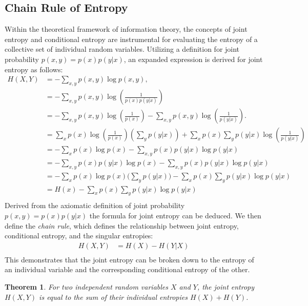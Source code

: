 \documentclass[journal,12pt,onecolumn,draftclsnofoot,]{IEEEtran}
\newtheorem{theorem}{Theorem}
\begin{document}
	
	\subsection{Chain Rule of Entropy}
	Within the theoretical framework of information theory, the concepts of joint entropy and conditional entropy are instrumental for evaluating the entropy of a collective set of individual random variables. Utilizing a  definition for joint probability \( p(x, y) = p(x) p(y | x) \), an expanded expression is derived for joint entropy as follows:
	\begin{align}
		H(X, Y) & = -\sum_{x, y} p(x, y) \log p(x, y), \\
		&= -\sum_{x, y} p(x, y) \log \left(\frac{1}{p(x)p(y|x)}\right) \\
		&= -\sum_{x, y} p(x, y) \log \left(\frac{1}{p(x)}\right) - \sum_{x, y} p(x, y) \log \left(\frac{1}{p(y|x)}\right).\\
		&= \sum_{x} p(x) \log \left(\frac{1}{p(x)}\right) \left(\sum_{y} p(y|x)\right) + \sum_{x} p(x) \sum_{y} p(y|x) \log \left(\frac{1}{p(y|x)}\right) \\
		& = -\sum_{x} p(x) \log p(x) - \sum_{x,y} p(x) p(y|x) \log p(y|x) \\
		& = -\sum_{x,y} p(x) p(y|x) \log p(x) - \sum_{x,y} p(x) p(y|x) \log p(y|x) \\
		& = -\sum_{x} p(x)  \log p(x) \Biggr( \sum_{y}  p(y|x)  \Biggr) - \sum_{x} p(x)  \sum_{y}  p(y|x)   \log p(y|x) \\
		& =H(x) - \sum_{x} p(x)  \sum_{y}  p(y|x)   \log p(y|x) \\
	\end{align}
	Derived from the axiomatic definition of joint probability \( p(x, y) = p(x) p(y | x) \) the formula for joint entropy can be deduced. We then define the \emph{chain rule}, which defines the relationship between joint entropy, conditional entropy, and the singular entropies:
	\begin{equation}
		\begin{split}
			H(X, Y) 
			& =  H(X) - H(Y|X) \\
		\end{split}
	\end{equation}
	This demonstrates that the joint entropy can be broken down to the entropy of an individual variable and the corresponding conditional entropy of the other.
	\begin{theorem}
		For two independent random variables \(X\) and \(Y\), the joint entropy \(H(X, Y)\) is equal to the sum of their individual entropies \(H(X) + H(Y)\).
	\end{theorem}
\end{document}
